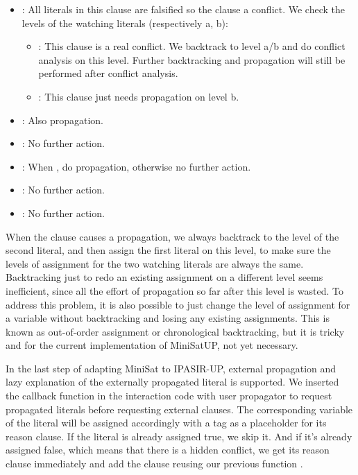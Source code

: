 \begin{itemize}
  \item {}: All literals in this clause are falsified so the clause a conflict. We check the levels of the watching literals (respectively a, b):
  \begin{itemize}
    \item {}: This clause is a real conflict. We backtrack to level a/b and do conflict analysis on this level. Further backtracking and propagation will still be performed after conflict analysis.
    \item {}: This clause just needs propagation on level b.
  \end{itemize}
  \item {}: Also propagation.
  \item {}: No further action.
  \item {}: When , do propagation, otherwise no further action.
  \item {}: No further action.
  \item {}: No further action.
\end{itemize}

When the clause causes a propagation, we always backtrack to the level of the second literal, and then assign the first literal on this level, to make sure the levels of assignment for the two watching literals are always the same. Backtracking just to redo an existing assignment on a different level seems inefficient, since all the effort of propagation so far after this level is wasted. To address this problem, it is also possible to just change the level of assignment for a variable without backtracking and losing any existing assignments. This is known as out-of-order assignment or chronological backtracking, but it is tricky and for the current implementation of MiniSatUP, not yet necessary.

In the last step of adapting MiniSat to IPASIR-UP, external propagation and lazy explanation of the externally propagated literal is supported. We inserted the callback function  in the interaction code with user propagator to request propagated literals before requesting external clauses. The corresponding variable of the literal will be assigned accordingly with a tag  as a placeholder for its reason clause. If the literal is already assigned true, we skip it. And if it's already assigned false, which means that there is a hidden conflict, we get its reason clause immediately and add the clause reusing our previous function .

